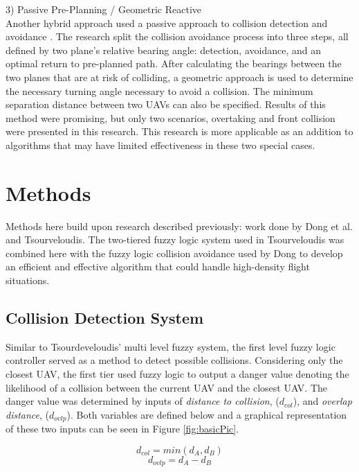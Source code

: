 \documentclass[10pt, conference, compsocconf]{IEEEtran}
\begin{document}
3) Passive Pre-Planning / Geometric Reactive \\
Another hybrid approach used a passive approach to collision detection and avoidance \cite{angelov2008passive}. The research split the collision avoidance process into three steps, all defined by two plane's relative bearing angle: detection, avoidance, and an optimal return to pre-planned path. After calculating the bearings between the two planes that are at risk of colliding, a geometric approach is used to determine the necessary turning angle necessary to avoid a collision. The minimum separation distance between two UAVs can also be specified. Results of this method were promising, but only two scenarios, overtaking and front collision were presented in this research. This research is more applicable as an addition to algorithms that may have limited effectiveness in these two special cases.

\section{Methods}
Methods here build upon research described previously: work done by Dong et al. and Tsourveloudis.  The two-tiered fuzzy logic system used in Tsourveloudis \cite{tsourveloudis2001autonomous} was combined here with the fuzzy logic collision avoidance used by Dong \cite{dong2005path} to develop an efficient and effective algorithm that could handle high-density flight situations. 

\subsection{Collision Detection System}
Similar to Tsourdeveloudis' multi level fuzzy system, the first level fuzzy logic controller served as a method to detect possible collisions.  Considering only the closest UAV, the first tier used fuzzy logic to output a danger value denoting the likelihood of a collision between the current UAV and the closest UAV. The danger value was determined by inputs of {\it distance to collision}, ($d_{col}$), and {\it overlap distance}, ($d_{ovlp}$). Both variables are defined below and a graphical representation of these two inputs can be seen in Figure \ref{fig:basicPic}.

\begin{equation}
d_{col} = min(d_{A}, d_{B})
\end{equation}
\begin{equation}
d_{ovlp} = d_{A} - d_{B}
\end{equation}
\end{document}
